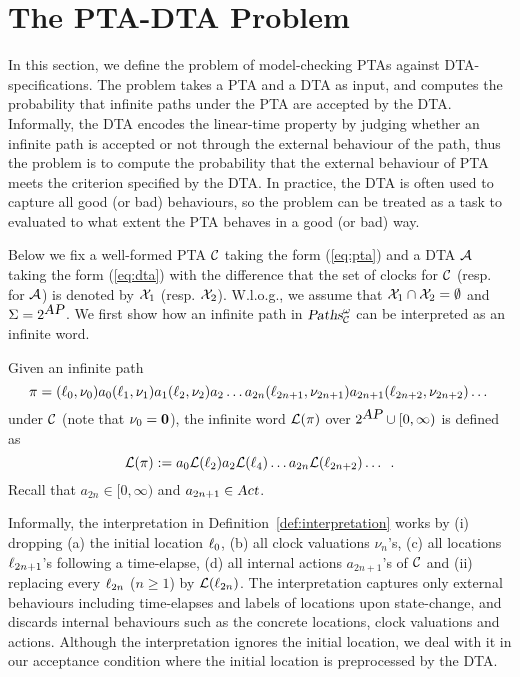 
\vspace{-0.8em}
\section{The PTA-DTA Problem}
\vspace{-0.8em}

In this section, we define the problem of model-checking PTAs against DTA-specifications.
The problem takes a PTA and a DTA as input, and computes the probability that infinite paths under the PTA are accepted by the DTA.
Informally, the DTA encodes the linear-time property by judging whether an infinite path is accepted or not through the external behaviour of the path,
thus the problem is to compute the probability that the external behaviour of PTA meets the criterion specified by the DTA.
In practice, the DTA is often used to capture all good (or bad) behaviours, so the problem can be treated as a task to evaluated to what extent the PTA behaves in a good (or bad) way.

Below we fix a well-formed PTA $\mathcal{C}$ taking the form (\ref{eq:pta}) and a DTA $\mathcal{A}$ taking the form (\ref{eq:dta}) 
with the difference that the set of clocks for $\mathcal{C}$ (resp. for $\mathcal{A}$) is denoted by $\mathcal{X}_1$ (resp. $\mathcal{X}_2$).
W.l.o.g., we assume that $\mathcal{X}_1\cap\mathcal{X}_2=\emptyset$ and $\Sigma=2^{\mbox{\sl AP}}$.
We first show how an infinite path in $\mbox{\sl Paths}^\omega_{\mathcal{C}}$ can be interpreted as an infinite word.

\vspace{-0.8em}
\begin{definition}\label{def:interpretation}
Given an infinite path
\[
\pi=(\ell_0,\nu_0)a_0(\ell_1,\nu_1)a_1(\ell_2,\nu_2)a_2\dots a_{2n}(\ell_{2n+1},\nu_{2n+1})a_{2n+1}(\ell_{2n+2},\nu_{2n+2})\dots
\]
under $\mathcal{C}$ (note that $\nu_0=\mathbf{0}$), the infinite word $\mathcal{L}(\pi)$ over $2^{\mbox{\sl AP}}\cup[0,\infty)$ is defined as 
\[
\mathcal{L}(\pi):=a_0\mathcal{L}(\ell_2)a_2\mathcal{L}(\ell_4)\dots a_{2n}\mathcal{L}(\ell_{2n+2}) \dots\enskip.
\]
Recall that $a_{2n}\in [0,\infty)$ and $a_{2n+1}\in\mbox{\sl Act}$. 
\end{definition}

\begin{remark}
Informally, the interpretation in Definition~\ref{def:interpretation} works
by (i) dropping (a) the initial location $\ell_0$, (b) all clock valuations $\nu_n$'s, 
(c) all locations $\ell_{2n+1}$'s following a time-elapse,
(d) all internal actions $a_{2n+1}$'s of $\mathcal{C}$ and (ii) replacing every $\ell_{2n}$ ($n\ge 1$) by $\mathcal{L}(\ell_{2n})$.
The interpretation captures only external behaviours including time-elapses and labels of locations upon state-change, and discards internal behaviours such as the concrete locations, clock valuations and actions.
Although the interpretation ignores the initial location,
we deal with it in our acceptance condition where the initial location is preprocessed by the DTA.
\end{remark}

